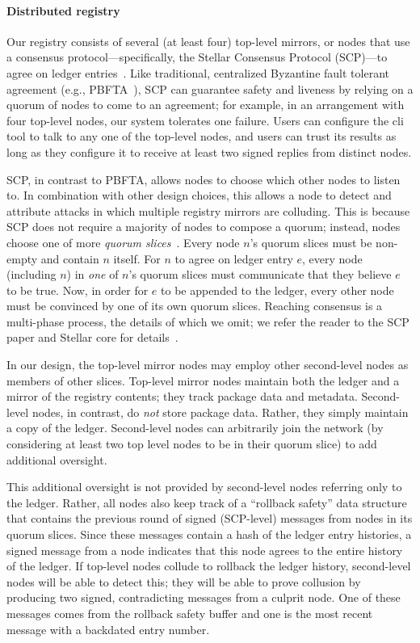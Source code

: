 \paragraph{Distributed registry}
Our registry consists of several (at least four) top-level mirrors, or nodes
that use a consensus protocol---specifically, the Stellar Consensus
Protocol (SCP)---to agree on ledger entries~\cite{stellar}.
Like traditional, centralized Byzantine fault tolerant
agreement (e.g., PBFTA~\cite{pbfts}), SCP can guarantee safety and liveness by
relying on a quorum of nodes to come to an agreement; for example, in an
arrangement with four top-level nodes, our system tolerates one failure.
Users can configure the \spam{} cli tool to talk to any one of the top-level
nodes, and users can trust its results as long as they configure it
to receive at least two signed replies from distinct nodes.

SCP, in contrast to PBFTA, allows nodes to choose which other nodes to listen to. 
In combination with other design choices, this allows a node to detect and
attribute attacks in which multiple registry mirrors are colluding.
This is because SCP does not require a majority of nodes to compose a quorum;
instead, nodes choose one of more \emph{quorum slices}~\cite{stellar}.
Every node $n$'s quorum slices must be non-empty and contain $n$ itself.
For $n$ to agree on ledger entry $e$, every node (including $n$) in \emph{one} of
$n$'s quorum slices must communicate that they believe $e$ to be
true. Now, in order for $e$ to be appended to the
ledger, every other node must be convinced by one of its own quorum slices.
Reaching consensus is a multi-phase process, the details of which we omit;
we refer the reader to the SCP paper and Stellar core for details~\cite{stellar,core}.

In our design, the top-level mirror nodes may employ other
second-level nodes as members of other slices. Top-level mirror nodes maintain both
the ledger and a mirror of the registry contents; they track package data and metadata. 
Second-level nodes, in contrast, do \emph{not} store package data.
Rather, they simply maintain a copy of the ledger. Second-level nodes can arbitrarily
join the network (by considering at least two top level nodes to be in their
quorum slice) to add additional oversight.

This additional oversight is not provided by second-level nodes referring
only to the ledger. Rather, all nodes also keep track of a ``rollback safety''
data structure that contains the previous round of signed (SCP-level) messages from nodes in its quorum
slices. Since these messages contain a hash of the ledger entry histories, a signed
message from a node indicates that this node agrees to the entire history of the
ledger. If top-level nodes collude to rollback the ledger history, second-level nodes
will be able to detect this; they will be able to prove collusion by producing
two signed, contradicting messages from a culprit node. One of these messages
comes from the rollback safety buffer and one is the most recent message with
a backdated entry number. 

